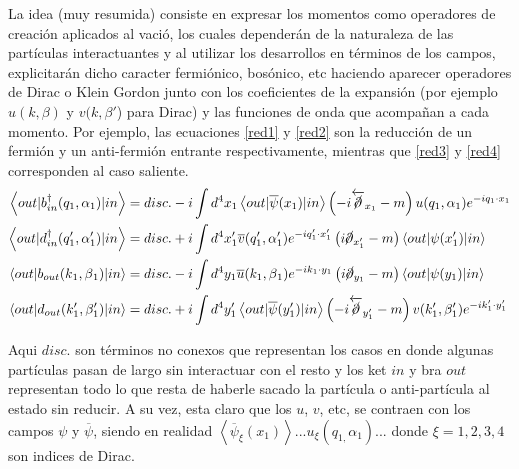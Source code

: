 \documentclass{article}
\numberwithin{equation}{section}
\begin{document}
La idea (muy resumida) consiste en expresar los momentos como operadores
de creación aplicados al vació, los cuales dependerán de la naturaleza
de las partículas interactuantes y al utilizar los desarrollos en términos de
los campos, explicitarán dicho caracter fermiónico, bosónico, etc
haciendo aparecer operadores de Dirac o Klein Gordon junto con los
coeficientes de la expansión (por ejemplo $u(k,\beta)$ y $v(k,\beta'$)
para Dirac) y las funciones de onda que acompañan a cada momento.
Por ejemplo, las ecuaciones \ref{red1} y \ref{red2}  son la reducción de un fermión
y un anti-fermión entrante respectivamente, mientras que \ref{red3}  y \ref{red4}  corresponden
al caso saliente.
\begin{subequations}\label{red}
	\begin{align}
	\left\langle out|b_{in}^{\dagger}(q_{1},\alpha_{1})|in\right\rangle  & =disc.-i\int d^{4}x_{1}\left\langle out|\overline{\psi}(x_{1})|in\right\rangle \left(-i\overleftarrow{\cancel{\partial}}_{x_{1}}-m\right)u(q_{1},\alpha_{1})e^{-iq_{1}\cdot x_{1}} \label{red1}\\
	\left\langle out|d_{in}^{\dagger}(q'_{1},\alpha'_{1})|in\right\rangle  & =disc.+i\int d^{4}x'_{1}\overline{v}(q'_{1},\alpha'_{1})e^{-iq'_{1}\cdot x'_{1}}\left(i\cancel{\partial}_{x'_{1}}-m\right)\left\langle out|\psi(x'_{1})|in\right\rangle \label{red2} \\
	\left\langle out|b_{out}(k{}_{1},\beta{}_{1})|in\right\rangle  & =disc.-i\int d^{4}y_{1}\overline{u}(k_{1},\beta{}_{1})e^{-ik_{1}\cdot y_{1}}\left(i\cancel{\partial}_{y_{1}}-m\right)\left\langle out|\psi(y_{1})|in\right\rangle \label{red3} \\
	\left\langle out|d_{out}(k'_{1},\beta'_{1})|in\right\rangle  & =disc.+i\int d^{4}y'_{1}\left\langle out|\overline{\psi}(y'_{1})|in\right\rangle \left(-i\overleftarrow{\cancel{\partial}}_{y'_{1}}-m\right)v(k'_{1},\beta'_{1})e^{-ik'_{1}\cdot y'_{1}} \label{red4}
	\end{align}
\end{subequations}

Aqui $disc.$ son términos no conexos que representan los casos en
donde algunas partículas pasan de largo sin interactuar con el resto
y los ket $ in $ y bra $ out $ representan todo lo que resta de haberle sacado
la partícula o anti-partícula al estado sin reducir. A su vez, esta
claro que los $ u $, $ v $, etc, se contraen con los campos $\psi$ y $\overline{\psi}$,
siendo en realidad $\left\langle \overline{\psi}_{\xi}(x_{1})\right\rangle ...u_{\xi}(q_{1,}\alpha_{1})$...
donde $\xi=1,2,3,4$ son indices de Dirac.
\end{document}
